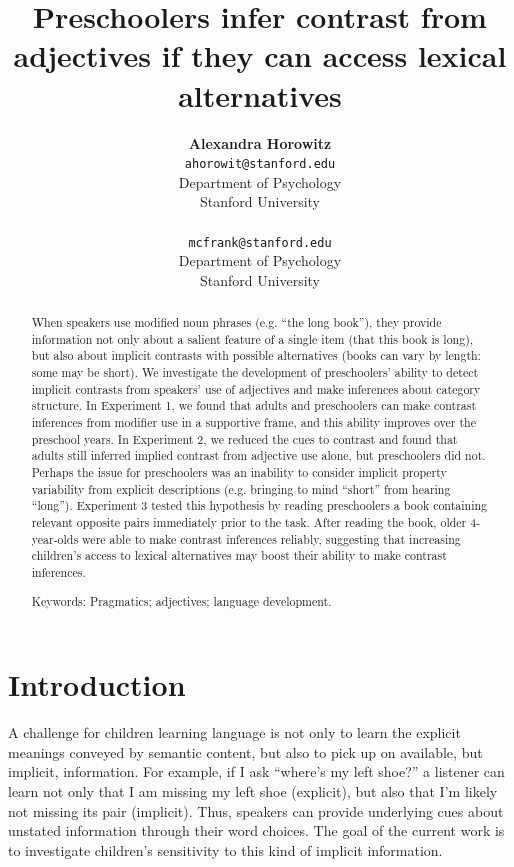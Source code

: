 \documentclass[10pt,letterpaper]{article}
\title{Preschoolers infer contrast from adjectives if they can access lexical alternatives}
\author{{\large \bf Alexandra Horowitz} \\ \texttt{ahorowit@stanford.edu}\\ Department of Psychology \\ Stanford University \\ 
\And {\large \bf Michael C. Frank} \\ \texttt{mcfrank@stanford.edu} \\ Department of Psychology \\ Stanford University \\ }
\begin{document}
\maketitle

\begin{abstract} 

When speakers use modified noun phrases (e.g. ``the long book''), they provide information not only about a salient feature of a single item (that this book is long), but also about implicit contrasts with possible alternatives (books can vary by length: some may be short).  We investigate the development of preschoolers' ability to detect implicit contrasts from speakers' use of adjectives and make inferences about category structure.  In Experiment 1, we found that adults and preschoolers can make contrast inferences from modifier use in a supportive frame, and this ability improves over the preschool years.  In Experiment 2, we reduced the cues to contrast and found that adults still inferred implied contrast from adjective use alone, but preschoolers did not.  Perhaps the issue for preschoolers was an inability to consider implicit property variability from  explicit descriptions (e.g. bringing to mind ``short'' from hearing ``long'').  
Experiment 3 tested this hypothesis by reading preschoolers a book containing relevant opposite pairs immediately prior to the task.  After reading the book, older 4-year-olds were able to make contrast inferences reliably, suggesting that increasing children's access to lexical alternatives may boost their ability to make contrast inferences.

{Keywords:} Pragmatics; adjectives; language development. 
\end{abstract}

\section{Introduction}

A challenge for children learning language is not only to learn the explicit meanings conveyed by semantic content, but also to pick up on available, but implicit, information.  For example, if I ask ``where's my left shoe?'' a listener can learn not only that I am missing my left shoe (explicit), but also that I'm likely not missing its pair (implicit).  Thus, speakers can provide underlying cues about unstated information through their word choices.  The goal of the current work is to investigate children's sensitivity to this kind of implicit information. 
\end{document}
